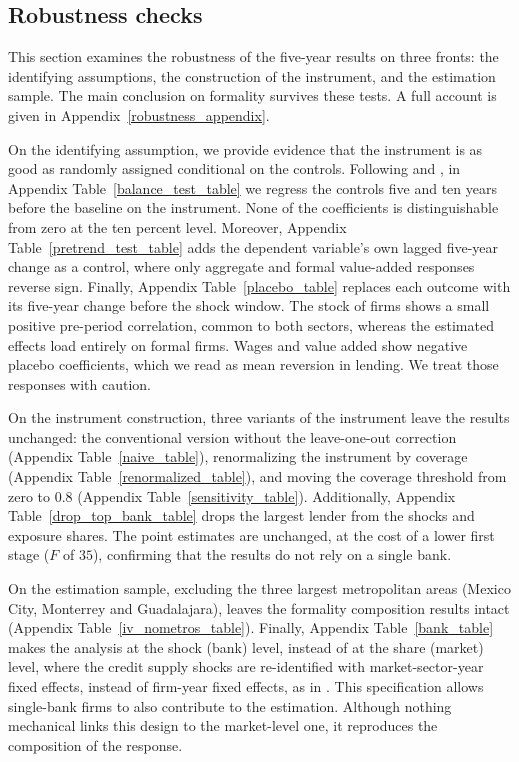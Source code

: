\documentclass[12pt]{article}
\begin{document}
\subsection{Robustness checks} \label{robustness}

This section examines the robustness of the five-year results on three fronts: the identifying assumptions, the construction of the instrument, and the estimation sample. The main conclusion on formality survives these tests. A full account is given in Appendix~\ref{robustness_appendix}. 

On the identifying assumption, we provide evidence that the instrument is as good as randomly assigned conditional on the controls.  Following \citet{borusyak2022quasi} and \citet{goldsmith2020bartik}, in Appendix Table~\ref{balance_test_table} we regress the controls five and ten years before the baseline on the instrument. None of the coefficients is distinguishable from zero at the ten percent level. Moreover, Appendix Table~\ref{pretrend_test_table} adds the dependent variable's own lagged five-year change as a control, where only aggregate and formal value-added responses reverse sign. Finally, Appendix Table~\ref{placebo_table} replaces each outcome with its five-year change before the shock window. The stock of firms shows a small positive pre-period correlation, common to both sectors, whereas the estimated effects load entirely on formal firms. Wages and value added show negative placebo coefficients, which we read as mean reversion in lending. We treat those responses with caution. 

On the instrument construction, three variants of the instrument leave the results unchanged: the conventional version without the leave-one-out correction (Appendix Table~\ref{naive_table}), renormalizing the instrument by coverage (Appendix Table~\ref{renormalized_table}), and moving the coverage threshold from zero to $0.8$ (Appendix Table~\ref{sensitivity_table}). Additionally, Appendix Table~\ref{drop_top_bank_table} drops the largest lender from the shocks and exposure shares. The point estimates are unchanged, at the cost of a lower first stage ($F$ of $35$), confirming that the results do not rely on a single bank. 

On the estimation sample, excluding the three largest metropolitan areas (Mexico City, Monterrey and Guadalajara), leaves the formality composition results intact (Appendix Table~\ref{iv_nometros_table}). Finally, Appendix Table~\ref{bank_table} makes the analysis at the shock (bank) level, instead of at the share (market) level, where the credit supply shocks are re-identified with market-sector-year fixed effects, instead of firm-year fixed effects, as in \citet{degryse2019identifying}. This specification allows single-bank firms to also contribute to the estimation. Although nothing mechanical links this design to the market-level one, it reproduces the composition of the response.
\end{document}
